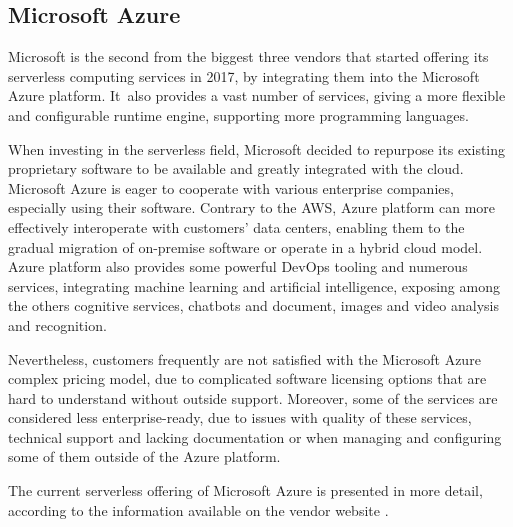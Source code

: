 \subsection{Microsoft Azure}

Microsoft is the second from the biggest three vendors that started offering its serverless computing services in 2017, by integrating them into the Microsoft Azure platform. It~also provides a vast number of services, giving a more flexible and configurable runtime engine, supporting more programming languages.

When investing in the serverless field, Microsoft decided to repurpose its existing proprietary software to be available and greatly integrated with the cloud. Microsoft Azure is eager to cooperate with various enterprise companies, especially using their software. Contrary to the AWS, Azure platform can more effectively interoperate with customers' data centers, enabling them to the gradual migration of on-premise software or operate in a hybrid cloud model. Azure platform also provides some powerful DevOps tooling and numerous services, integrating machine learning and artificial intelligence, exposing among the others cognitive services, chatbots and document, images and video analysis and recognition.

Nevertheless, customers frequently are not satisfied with the Microsoft Azure complex pricing model, due to complicated software licensing options that are hard to understand without outside support. Moreover, some of the services are considered less enterprise-ready, due to issues with quality of these services, technical support and lacking documentation or when managing and configuring some of them outside of the Azure platform.

The current serverless offering of Microsoft Azure is presented in more detail, according to the information available on the vendor website \cite{AzureServerlessOffering}.

